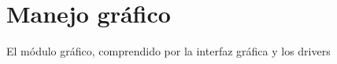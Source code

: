 \documentclass[10pt,a4paper]{article}
\author{Tomás González Orlando}
\begin{document}
\section{Manejo gráfico}

El módulo gráfico, comprendido por la interfaz gráfica y los drivers
\end{document}

